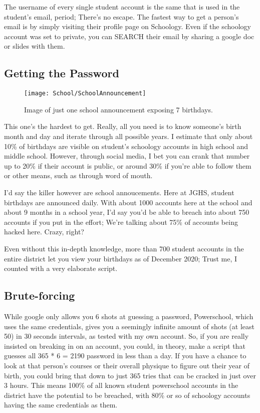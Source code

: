 The username of every single student account is the same that is used in the student's email, period; There's no escape. The fastest way to get a person's email is by simply visiting their profile page on Schoology. Even if the schoology account was set to private, you can SEARCH their email by sharing a google doc or slides with them.

\subsection{Getting the Password}

\begin{figure}[h]
    \centering
    \texttt{[image: School/SchoolAnnouncement]}
    \caption{
        Image of just one school announcement exposing 7 birthdays.
    }
\end{figure}


This one's the hardest to get. Really, all you need is to know someone's birth month and day and iterate through all possible years. I estimate that only about 10\% of birthdays are visible on student's schoology accounts in high school and middle school. However, through social media, I bet you can crank that number up to 20\% if their account is public, or around 30\% if you're able to follow them or other means, such as through word of mouth.

I'd say the killer however are school annoucements. Here at JGHS, student birthdays are announced daily. With about 1000 accounts here at the school and about 9 months in a school year, I'd say you'd be able to breach into about 750 accounts if you put in the effort; We're talking about 75\% of accounts being hacked here. Crazy, right?

Even without this in-depth knowledge, more than 700 student accounts in the entire district let you view your birthdays as of December 2020; Trust me, I counted with a very elaborate script.

\subsection{Brute-forcing}

While google only allows you 6 shots at guessing a password, Powerschool, which uses the same credentials, gives you a seemingly infinite amount of shots (at least 50) in 30 seconds intervals, as tested with my own account. So, if you are really insisted on breaking in on an account, you could, in theory, make a script that guesses all 365 * 6 = 2190 password in less than a day. If you have a chance to look at that person's courses or their overall physique to figure out their year of birth, you could bring that down to just 365 tries that can be cracked in just over 3 hours. This means 100\% of all known student powerschool accounts in the district have the potential to be breached, with 80\% or so of schoology accounts having the same credentials as them.

